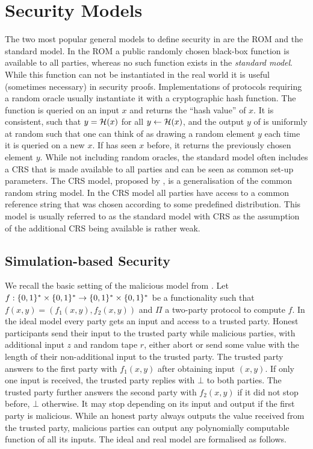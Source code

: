 \section{Security Models}
The two most popular general models to define security in are the \ac{ROM} and the standard model.
In the \ac{ROM} a public randomly chosen black-box function \RO is available to all parties, whereas no such function exists in the \emph{standard model}.
While this function \RO can not be instantiated in the real world it is useful (sometimes necessary) in security proofs.
Implementations of protocols requiring a random oracle usually instantiate it with a cryptographic hash function.
The function \RO is queried on an input $x$ and returns the ``hash value'' of $x$.
It is consistent, such that $y=\mathcal{H}(x)$ for all $y\gets \mathcal{H}(x)$, and the output $y$ of \RO is uniformly at random such that one can think of \RO as drawing a random element $y$ each time it is queried on a new $x$.
If \RO has seen $x$ before, it returns the previously chosen element $y$.
While not including random oracles, the standard model often includes a \ac{CRS} that is made available to all parties and can be seen as common set-up parameters.
The \acl{CRS} model, proposed by \citet{CanettiF01}, is a generalisation of the common random string model.
In the \ac{CRS} model all parties have access to a common reference string that was chosen according to some predefined distribution.
This model is usually referred to as the standard model with \ac{CRS} as the assumption of the additional \ac{CRS} being available is rather weak.

\subsection{Simulation-based Security}\label{app:simulation}
We recall the basic setting of the malicious model from \citet{Goldreich2004}.
Let $f:\{0,1\}^\ast \times \{0,1\}^\ast \rightarrow \{0,1\}^\ast \times \{0,1\}^\ast$ be a functionality such that $f(x,y)=(f_1(x, y), f_2(x,y))$ and $\Pi$ a two-party protocol to compute $f$.
In the ideal model every party gets an input and access to a trusted party.
Honest participants send their input to the trusted party while malicious parties, with additional input $z$ and random tape $r$, either abort or send some value with the length of their non-additional input to the trusted party.
The trusted party answers to the first party with $f_1(x, y)$ after obtaining input $(x,y)$.
If only one input is received, the trusted party replies with $\bot$ to both parties.
The trusted party further answers the second party with $f_2(x,y)$ if it did not stop before, $\bot$ otherwise.
It may stop depending on its input and output if the first party is malicious.
While an honest party always outputs the value received from the trusted party, malicious parties can output any polynomially computable function of all its inputs.
The ideal and real model are formalised as follows.

